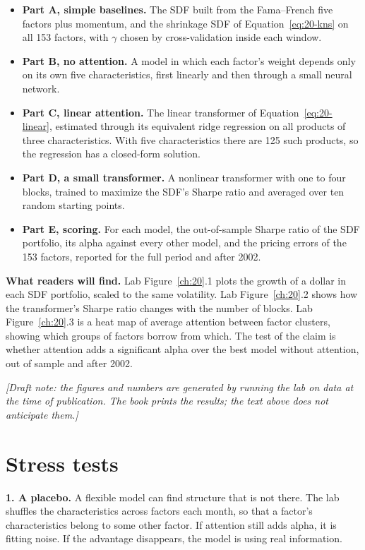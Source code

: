 \begin{itemize}
  \item \textbf{Part A, simple baselines.} The SDF built from the Fama--French five factors plus momentum, and the shrinkage SDF of Equation~\eqref{eq:20-kns} on all 153 factors, with $\gamma$ chosen by cross-validation inside each window.
  \item \textbf{Part B, no attention.} A model in which each factor's weight depends only on its own five characteristics, first linearly and then through a small neural network.
  \item \textbf{Part C, linear attention.} The linear transformer of Equation~\eqref{eq:20-linear}, estimated through its equivalent ridge regression on all products of three characteristics. With five characteristics there are 125 such products, so the regression has a closed-form solution.
  \item \textbf{Part D, a small transformer.} A nonlinear transformer with one to four blocks, trained to maximize the SDF's Sharpe ratio and averaged over ten random starting points.
  \item \textbf{Part E, scoring.} For each model, the out-of-sample Sharpe ratio of the SDF portfolio, its alpha against every other model, and the pricing errors of the 153 factors, reported for the full period and after 2002.
\end{itemize}

\textbf{What readers will find.} Lab Figure~\ref{ch:20}.1 plots the growth of a dollar in each SDF portfolio, scaled to the same volatility. Lab Figure~\ref{ch:20}.2 shows how the transformer's Sharpe ratio changes with the number of blocks. Lab Figure~\ref{ch:20}.3 is a heat map of average attention between factor clusters, showing which groups of factors borrow from which. The test of the claim is whether attention adds a significant alpha over the best model without attention, out of sample and after 2002.

\emph{[Draft note: the figures and numbers are generated by running the lab on data at the time of publication. The book prints the results; the text above does not anticipate them.]}

\section{Stress tests}
\label{sec:20-stress}

\textbf{1. A placebo.} A flexible model can find structure that is not there. The lab shuffles the characteristics across factors each month, so that a factor's characteristics belong to some other factor. If attention still adds alpha, it is fitting noise. If the advantage disappears, the model is using real information.

